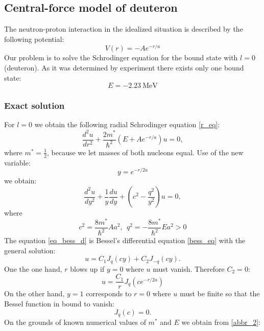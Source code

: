 \documentclass[a4paper, 12pt]{article}
\begin{document}
\subsection{Central-force model of deuteron}

The neutron-proton interaction in the idealized situation is described by the following potential:
$$V(r) = - A e^{-r/a}$$
Our problem is to solve the Schrodinger equation for the bound state with $l=0$ (deuteron). As it was determined by experiment there exists only one bound state:
\begin{equation}
    E = -2.23~\mathrm{MeV}
\end{equation}


\subsubsection{Exact solution}
For $l = 0$ we obtain the following radial Schrodinger equation \eqref{r_eq}:
\begin{equation}
    \frac{d^2 u}{d r^2} + \frac{2 m^*}{\hbar^2}(E+ A e^{-r/a})u = 0,
\end{equation}
where $m^* = \frac{1}{2}$, because we let masses of both nucleons equal. Use of the new variable:
\begin{equation}\label{abbr}
    y = e^{-r/2a}
\end{equation}
we obtain:
\begin{equation}\label{eq_bess_d}
    \frac{d^2 u}{d y^2} + \frac{1}{y}\frac{d u}{d y} + (c^2 - \frac{q^2}{y^2})u=0,
\end{equation}
where
\begin{equation}\label{abbr_2}
    c^2 = \frac{8 m^*}{\hbar^2}A a^2,~~q^2 = -\frac{8 m^*}{\hbar^2}E a^2 > 0
\end{equation}
The equation  \eqref{eq_bess_d} is Bessel's differential equation \eqref{bess_eq} with the general solution:
$$u = C_1 J_q(cy) + C_2 J_{-q} (cy).$$
One the one hand, $r$ blows up if $y = 0$ where $u$ must vanish. Therefore $C_2 = 0:$
\begin{equation}\label{ex_sol_deuteron}
    u = \frac{C_1}{r}J_q(c e^{-r/2a})
\end{equation}
On the other hand, $y = 1$ corresponds to $r = 0$ where $u$ must be finite so that the Bessel function in bound to vanish:
$$J_q(c) = 0.$$
On the grounds of known numerical values of $m^*$ and $E$ we obtain from \eqref{abbr_2}:
\end{document}
